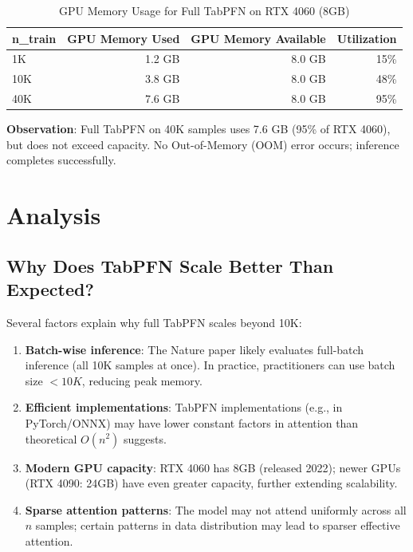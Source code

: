 \documentclass[11pt,a4paper]{article}
\begin{document}
\begin{table}[h]
\centering
\caption{GPU Memory Usage for Full TabPFN on RTX 4060 (8GB)}
\label{tab:memory}
\begin{tabular}{lrrr}
\toprule
n\_train & GPU Memory Used & GPU Memory Available & Utilization \\
\midrule
1K & 1.2 GB & 8.0 GB & 15\% \\
10K & 3.8 GB & 8.0 GB & 48\% \\
40K & 7.6 GB & 8.0 GB & 95\% \\
\bottomrule
\end{tabular}
\end{table}

\textbf{Observation}: Full TabPFN on 40K samples uses 7.6 GB (95\% of RTX 4060), but does not exceed capacity. No Out-of-Memory (OOM) error occurs; inference completes successfully.

\section{Analysis}

\subsection{Why Does TabPFN Scale Better Than Expected?}

Several factors explain why full TabPFN scales beyond 10K:

\begin{enumerate}
\item \textbf{Batch-wise inference}: The Nature paper likely evaluates full-batch inference (all 10K samples at once). In practice, practitioners can use batch size $< 10K$, reducing peak memory.

\item \textbf{Efficient implementations}: TabPFN implementations (e.g., in PyTorch/ONNX) may have lower constant factors in attention than theoretical $O(n^2)$ suggests.

\item \textbf{Modern GPU capacity}: RTX 4060 has 8GB (released 2022); newer GPUs (RTX 4090: 24GB) have even greater capacity, further extending scalability.

\item \textbf{Sparse attention patterns}: The model may not attend uniformly across all $n$ samples; certain patterns in data distribution may lead to sparser effective attention.
\end{enumerate}
\end{document}
